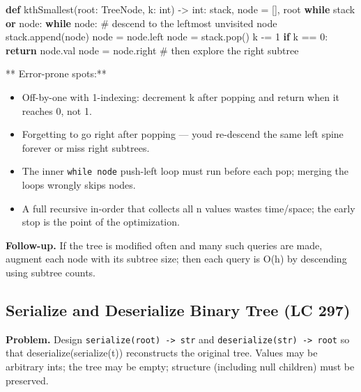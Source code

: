 \documentclass[11pt]{article}
\providecommand{\tightlist}{\setlength{\itemsep}{1pt}\setlength{\parskip}{0pt}}
\newenvironment{Shaded}{\begin{snugshade}}{\end{snugshade}}
\newcommand{\BuiltInTok}[1]{\textcolor[rgb]{0.50,0.55,0.55}{#1}}
\newcommand{\CommentTok}[1]{\textcolor[rgb]{0.48,0.49,0.49}{#1}}
\newcommand{\ControlFlowTok}[1]{\textcolor[rgb]{0.99,0.74,0.29}{\textbf{#1}}}
\newcommand{\DecValTok}[1]{\textcolor[rgb]{0.96,0.45,0.00}{#1}}
\newcommand{\KeywordTok}[1]{\textcolor[rgb]{0.81,0.81,0.76}{\textbf{#1}}}
\newcommand{\NormalTok}[1]{\textcolor[rgb]{0.81,0.81,0.76}{#1}}
\newcommand{\OperatorTok}[1]{\textcolor[rgb]{0.81,0.81,0.76}{#1}}
\begin{document}
\begin{Shaded}
\begin{Highlighting}[]
\KeywordTok{def}\NormalTok{ kthSmallest(root: TreeNode, k: }\BuiltInTok{int}\NormalTok{) }\OperatorTok{{-}\textgreater{}} \BuiltInTok{int}\NormalTok{:}
\NormalTok{    stack, node }\OperatorTok{=}\NormalTok{ [], root}
    \ControlFlowTok{while}\NormalTok{ stack }\KeywordTok{or}\NormalTok{ node:}
        \ControlFlowTok{while}\NormalTok{ node:               }\CommentTok{\# descend to the leftmost unvisited node}
\NormalTok{            stack.append(node)}
\NormalTok{            node }\OperatorTok{=}\NormalTok{ node.left}
\NormalTok{        node }\OperatorTok{=}\NormalTok{ stack.pop()}
\NormalTok{        k }\OperatorTok{{-}=} \DecValTok{1}
        \ControlFlowTok{if}\NormalTok{ k }\OperatorTok{==} \DecValTok{0}\NormalTok{:}
            \ControlFlowTok{return}\NormalTok{ node.val}
\NormalTok{        node }\OperatorTok{=}\NormalTok{ node.right         }\CommentTok{\# then explore the right subtree}
\end{Highlighting}
\end{Shaded}

** Error-prone spots:**

\begin{itemize}
\tightlist
\item
  Off-by-one with 1-indexing: decrement k after popping and return when it reaches 0, not 1.
\item
  Forgetting to go right after popping --- you\textquotesingle d re-descend the same left spine forever or miss right subtrees.
\item
  The inner \texttt{while\ node} push-left loop must run before each pop; merging the loops wrongly skips nodes.
\item
  A full recursive in-order that collects all n values wastes time/space; the early stop is the point of the optimization.
\end{itemize}

\textbf{Follow-up.} If the tree is modified often and many such queries are made, augment each node with its subtree size; then each query is O(h) by descending using subtree counts.

\subsection{Serialize and Deserialize Binary Tree (LC 297)}\label{serialize-and-deserialize-binary-tree-lc-297}

\textbf{Problem.} Design \texttt{serialize(root)\ -\textgreater{}\ str} and \texttt{deserialize(str)\ -\textgreater{}\ root} so that deserialize(serialize(t)) reconstructs the original tree. Values may be arbitrary ints; the tree may be empty; structure (including null children) must be preserved.
\end{document}
